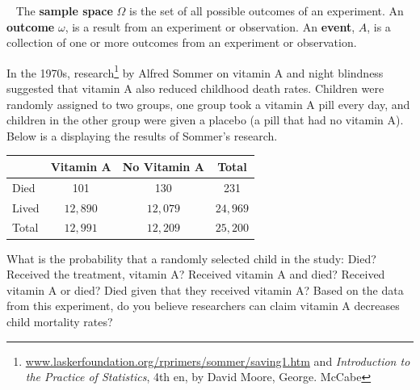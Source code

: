 
\bbox
\begin{definition}\label{def:ind}
 \ 
\bi 
\ii The \textbf{\alert{sample space}} $\Omega$ is the set of all possible outcomes of an experiment.
\ii An \textbf{\alert{outcome}} $\omega$, is a result from an experiment or observation.
\ii An \textbf{\alert{event}}, $A$, is a collection of one or more outcomes from an experiment or observation.
\ei
\end{definition}
\ebox

\bb
\ii In the 1970s, research\footnote{\href{www.laskerfoundation.org/rprimers/sommer/saving1.htm}{www.laskerfoundation.org/rprimers/sommer/saving1.htm} and \textit{Introduction to the Practice of Statistics}, 4th en, by David Moore, George. McCabe}  by Alfred Sommer on vitamin A and night blindness suggested that vitamin A also reduced childhood death rates. Children were randomly assigned to two groups, one group took a vitamin A pill every day, and children in the other group were given a \alert{placebo} (a pill that had no vitamin A). Below is a  displaying the results of Sommer’s research.

\begin{center}
\begin{tabular}{l||c|c||c}
 & Vitamin A & No Vitamin A & Total \\
 \hline
 Died & 101 & 130 & 231 \\
 Lived & $12,\!890$ & $12,\!079$ & $24,\!969$\\
 \hline
 Total & $12,\!991$ & $12,\!209$ & $25\!,200$
 \end{tabular}
 \end{center}

\bb
\ii What is the probability that a randomly selected child in the study:
\bb
\ii  Died? \vfill
\ii Received the treatment, vitamin A? \vfill
\ii Received vitamin A and died? \vfill
\ii Received vitamin A or died? \vfill
\ii Died given that they received vitamin A? \vfill
\ee
\ii Based on the data from this experiment, do you believe researchers can claim vitamin A decreases child mortality rates? \vfill
\ee
\ee


